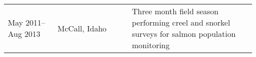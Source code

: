 \bigskip
\noindent
\begin{tabular}{ p{0.2\linewidth} p{0.3\linewidth} p{0.5\linewidth} }
    May 2011--Aug 2013 & McCall, Idaho & Three month field season performing creel and snorkel surveys for salmon population monitoring \\
\end{tabular}










